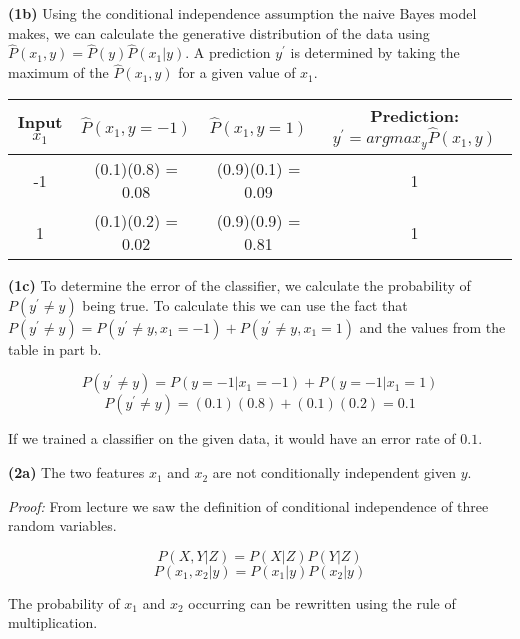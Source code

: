 \documentclass[11pt]{article}
\renewcommand\part[1]{\vspace{.10in}\textbf{(#1)}}
\begin{document}
\part{1b} Using the conditional independence assumption the naive Bayes model makes, we can calculate the generative distribution of the data using $\hat P(x_1, y) = \hat P(y) \hat P(x_1 | y)$. A prediction $y^\prime$ is determined by taking the maximum of the $\hat P(x_1, y)$ for a given value of $x_1$.

\begin{table}[H]
\centering
{\renewcommand{\arraystretch}{1.2}%
\begin{tabular}{| c | c | c | c |}
\hline
\textbf{Input} $x_1$ & $\hat P(x_1, y = -1)$ & $\hat P(x_1, y = 1)$ & \textbf{Prediction:} $y^\prime = argmax_y \hat P(x_1, y)$\\
\hline
-1 & (0.1)(0.8) = 0.08 & (0.9)(0.1) = 0.09 & 1\\ \hline
1 & (0.1)(0.2) = 0.02 & (0.9)(0.9) = 0.81 & 1\\ \hline
\end{tabular}}
\end{table}

\part{1c} To determine the error of the classifier, we calculate the probability of $P(y^\prime \neq y)$ being true. To calculate this we can use the fact that $P(y^\prime \neq y) = P(y^\prime \neq y, x_1 = -1) + P(y^\prime \neq y, x_1 = 1)$ and the values from the table in part b.

$$P(y^\prime \neq y) = P(y = -1 | x_1 = -1) + P(y = -1 | x_1 = 1)$$
$$P(y^\prime \neq y) = (0.1)(0.8) + (0.1)(0.2) = 0.1$$

If we trained a classifier on the given data, it would have an error rate of $0.1$.

\part{2a} The two features $x_1$ and $x_2$ are not conditionally independent given $y$.

\textit{Proof:} From lecture we saw the definition of conditional independence of three random variables.

$$P(X, Y|Z) = P(X|Z)P(Y|Z)$$
$$P(x_1, x_2|y) = P(x_1|y)P(x_2|y)$$

The probability of $x_1$ and $x_2$ occurring can be rewritten using the rule of multiplication.
\end{document}
